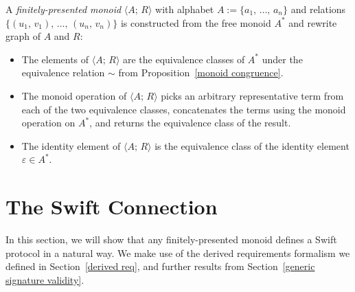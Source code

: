 \documentclass[../generics]{subfiles}
\begin{document}
\begin{definition} A \emph{finitely-presented monoid} $\langle A;\, R\rangle$ with alphabet $A:=\{a_1,\,\ldots,\,a_n\}$ and relations $\{(u_1,\,v_1),\,\ldots,\,(u_n,\,v_n)\}$ is constructed from the free monoid $A^*$ and rewrite graph of $A$ and $R$:
\begin{itemize}
\item The elements of $\langle A;\, R\rangle$ are the equivalence classes of $A^*$ under the equivalence relation $\sim$ from Proposition~\ref{monoid congruence}.
\item The monoid operation of $\langle A;\, R\rangle$ picks an arbitrary representative term from each of the two equivalence classes, concatenates the terms using the monoid operation on $A^*$, and returns the equivalence class of the result.
\item The identity element of $\langle A;\, R\rangle$ is the equivalence class of the identity element $\varepsilon\in A^*$.
\end{itemize}
\end{definition}

\section{The Swift Connection}\label{monoidsasprotocols}

In this section, we will show that any finitely-presented monoid defines a Swift protocol in a natural way. We make use of the derived requirements formalism we defined in Section~\ref{derived req}, and further results from Section~\ref{generic signature validity}.
\end{document}
